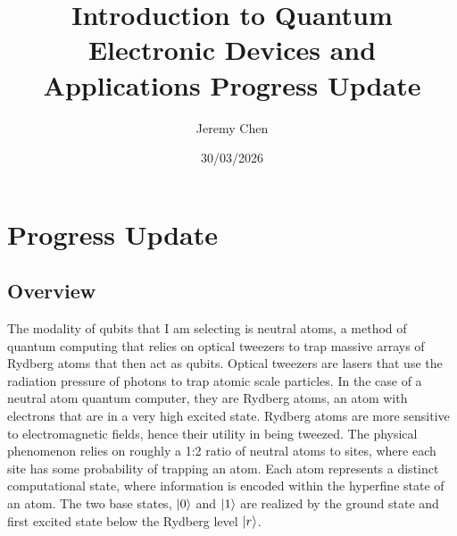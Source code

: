 \documentclass[10pt,letterpaper]{article}
\title{Introduction to Quantum Electronic Devices and Applications Progress Update}
\author{Jeremy Chen}
\date{30/03/2026}
\begin{document}
	\maketitle

\section*{Progress Update}
\subsection*{Overview}
The modality of qubits that I am selecting is neutral atoms, a method of quantum computing that relies on optical tweezers to trap massive arrays of Rydberg atoms that then act as qubits. Optical tweezers are lasers that use the radiation pressure of photons to trap atomic scale particles. In the case of a neutral atom quantum computer, they are Rydberg atoms, an atom with electrons that are in a very high excited state. Rydberg atoms are more sensitive to electromagnetic fields, hence their utility in being tweezed. The physical phenomenon relies on roughly a 1:2 ratio of neutral atoms to sites, where each site has some probability of trapping an atom. Each atom represents a distinct computational state, where information is encoded within the hyperfine state of an atom. The two base states, $\ket{0}$ and $\ket{1}$ are realized by the ground state and first excited state below the Rydberg level $\ket{r}$. 
\end{document}
